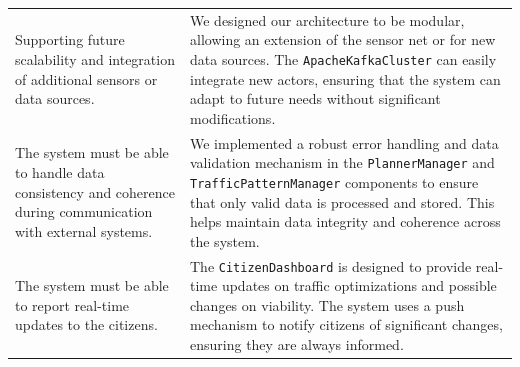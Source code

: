 \documentclass[12pt, a4paper, twoside, openright]{report}
\begin{document}
\begin{longtable}{>{\raggedright\arraybackslash}p{} >{\raggedright\arraybackslash}p{}}
Supporting future scalability and integration of additional sensors or data sources. &
We designed our architecture to be modular, allowing an extension of the sensor net or for new data sources. The \texttt{ApacheKafkaCluster} can easily integrate new actors, ensuring that the system can adapt to future needs without significant modifications. \\

The system must be able to handle data consistency and coherence during communication with external systems. &
We implemented a robust error handling and data validation mechanism in the \texttt{PlannerManager} and \texttt{TrafficPatternManager} components to ensure that only valid data is processed and stored. This helps maintain data integrity and coherence across the system. \\

The system must be able to report real-time updates to the citizens. &
The \texttt{CitizenDashboard} is designed to provide real-time updates on traffic optimizations and possible changes on viability. The system uses a push mechanism to notify citizens of significant changes, ensuring they are always informed. \\
\end{longtable}
\end{document}
